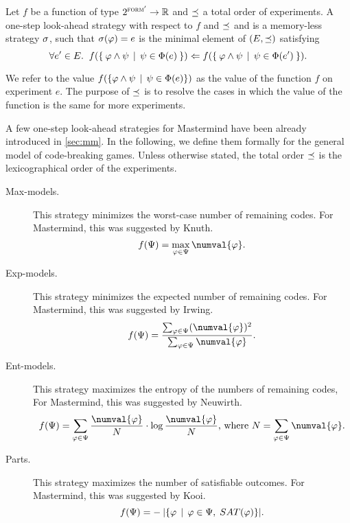 \newcommand{\formset}{\Psi}
\begin{definition}\label{def:oslas}
Let $f$ be a function of type $2^{{\textsc{form}'}} -> \mathbb{R}$ and
  $\preceq$ a total order of experiments.
A one-step look-ahead strategy with respect to $f$ and $\preceq$ and is
  a memory-less strategy $\sigma$, such that
  $\sigma(\varphi) = e$ is the minimal element of $(E,\preceq)$ satisfying
\[
\forall e'\in E. \;\; f(\{\:\varphi \wedge \psi \:\:|\:\: \psi\in\Phi(e) \:\}) <=
  f(\{\: \varphi \wedge \psi \:\:|\:\: \psi\in\Phi(e') \:\}).
\]
\end{definition}

We refer to the value $f(\{\varphi \wedge \psi \:\:|\:\: \psi\in\Phi(e)\})$
  as the value of the function $f$ on experiment $e$.
The purpose of $\preceq$ is to resolve the cases in which
  the value of the function is the same for more experiments.


A few one-step look-ahead strategies for Mastermind
  have been already introduced in \autoref{sec:mm}.
In the following, we define them formally for the general model of code-breaking games.
Unless otherwise stated, the total order $\preceq$ is
  the lexicographical order of the experiments.

\begin{description}
\item[Max-models.]
This strategy minimizes the worst-case number of remaining codes.
For Mastermind, this was suggested by Knuth\cite{mm-knuth}.
\[
f(\formset) = \max_{\form\in\formset} \numval{\form}.
\]

\item[Exp-models.]
This strategy minimizes the expected number of remaining codes.
  For Mastermind, this was suggested by Irwing\cite{mm-expnum}.
\[
f(\formset) = \frac{\sum_{\form\in\formset}(\numval{\form})^2}{\sum_{\form\in\formset} \numval{\form}}.
\]

\item[Ent-models.]
This strategy maximizes the entropy of the numbers of remaining codes,
For Mastermind, this was suggested by Neuwirth\cite{mm-entropy}.
\[
f(\formset) = \sum_{\form\in\formset} \frac{\numval{\form}}{N} \cdot \log \frac{\numval{\form}}{N}
  \textrm{, where } N = \sum_{\form\in\formset}\numval{\form}.
\]

\item[Parts.]
This strategy maximizes the number of satisfiable outcomes.
For Mastermind, this was suggested by Kooi\cite{mm-mostparts}.
\[
f(\formset) = - \:|\{ \form \| \form\in\formset, \;\SAT{\form} \}|.
\]
\end{description}

